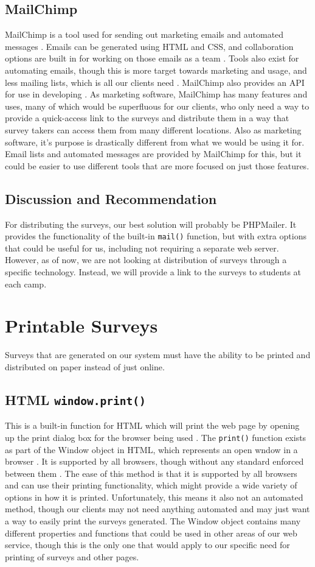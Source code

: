 \documentclass[letterpaper,10pt,serif, draftclsnofoot,onecolumn, compsoc, titlepage]{IEEEtran}
\begin{document}
\subsection{MailChimp}
MailChimp is a tool used for sending out marketing emails and automated messages \cite{mailchimp}.
Emails can be generated using HTML and CSS, and collaboration options are built in for working on those emails as a team \cite{mailchimp_features, mailchimp_email}.
Tools also exist for automating emails, though this is more target towards marketing and usage, and less mailing lists, which is all our clients need \cite{mailchimp_features}.
MailChimp also provides an API for use in developing \cite{mailchimp_features}.
As marketing software, MailChimp has many features and uses, many of which would be superfluous for our clients, who only need a way to provide a quick-access link to the surveys and distribute them in a way that survey takers can access them from many different locations.
Also as marketing software, it's purpose is drastically different from what we would be using it for.
Email lists and automated messages are provided by MailChimp for this, but it could be easier to use different tools that are more focused on just those features.
\subsection{Discussion and Recommendation}
For distributing the surveys, our best solution will probably be PHPMailer.
It provides the functionality of the built-in \texttt{mail()} function, but with extra options that could be useful for us, including not requiring a separate web server.
However, as of now, we are not looking at distribution of surveys through a specific technology.
Instead, we will provide a link to the surveys to students at each camp.

\section{Printable Surveys}
Surveys that are generated on our system must have the ability to be printed and distributed on paper instead of just online.
\subsection{HTML \texttt{window.print()}}
This is a built-in function for HTML which will print the web page by opening up the print dialog box for the browser being used \cite{window_print}.
The \texttt{print()} function exists as part of the Window object in HTML, which represents an open wndow in a browser \cite{window}.
It is supported by all browsers, though without any standard enforced between them \cite{window}.
The ease of this method is that it is supported by all browsers and can use their printing functionality, which might provide a wide variety of options in how it is printed.
Unfortunately, this means it also not an automated method, though our clients may not need anything automated and may just want a way to easily print the surveys generated.
The Window object contains many different properties and functions that could be used in other areas of our web service, though this is the only one that would apply to our specific need for printing of surveys and other pages.
\end{document}
